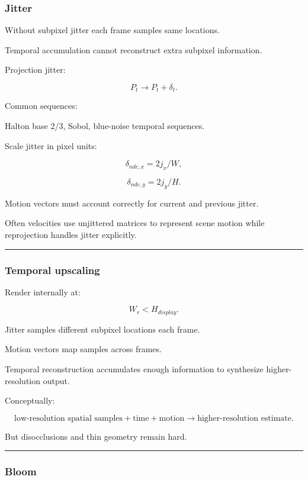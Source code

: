 \subsubsection{Jitter}\label{jitter}

Without subpixel jitter each frame samples same locations.

Temporal accumulation cannot reconstruct extra subpixel information.

Projection jitter:

\[
P_t
\rightarrow
P_t+\delta_t.
\]

Common sequences:

Halton base 2/3, Sobol, blue-noise temporal sequences.

Scale jitter in pixel units:

\[
\delta_{ndc,x}
=
2j_x/W,
\]

\[
\delta_{ndc,y}
=
2j_y/H.
\]

Motion vectors must account correctly for current and previous jitter.

Often velocities use unjittered matrices to represent scene motion while reprojection handles jitter explicitly.

\begin{center}\rule{0.5\linewidth}{0.5pt}\end{center}

\subsubsection{Temporal upscaling}\label{temporal-upscaling}

Render internally at:

\[
W_r<H_{display}.
\]

Jitter samples different subpixel locations each frame.

Motion vectors map samples across frames.

Temporal reconstruction accumulates enough information to synthesize higher-resolution output.

Conceptually:

\[
\boxed{
\text{low-resolution spatial samples}
+
\text{time}
+
\text{motion}
\rightarrow
\text{higher-resolution estimate}.
}
\]

But disocclusions and thin geometry remain hard.

\begin{center}\rule{0.5\linewidth}{0.5pt}\end{center}

\subsubsection{Bloom}\label{bloom}

